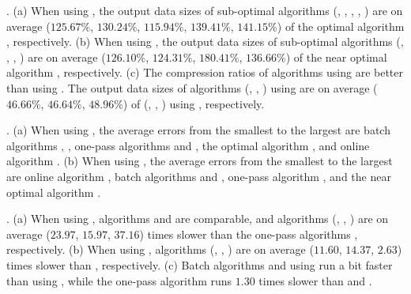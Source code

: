 \emph{}. 
(a) When using \ped, the output data sizes of sub-optimal algorithms (\tpa,
\dpa, \bqsa, \siped, \operb) are on average ($125.67\%$, $130.24\%$, $115.94\%$, $139.41\%$, $141.15\%$)
of the optimal algorithm \optp, respectively.
(b) When using \sed, the output data sizes of sub-optimal algorithms (\tpa,
\dpa, \squishe, \cised) are on average ($126.10\%$, $124.31\%$, $180.41\%$, $136.66\%$) of the near optimal algorithm \nopts, respectively.
(c) The compression ratios of algorithms using \ped are better than
using \sed. The output data sizes of algorithms (\optp, \tpa, \dpa) using \ped
are on average ($46.66\%$, $46.64\%$, $48.96\%$) of (\nopts, \tpa, \dpa) using \sed, respectively.

\emph{}. 
(a) When using \ped, the average errors from the smallest to the largest are batch algorithms \tpa, \dpa, one-pass algorithms \siped and \operb, the optimal algorithm \optp, and online algorithm \bqsa. 
(b) When using \sed, the average errors from the smallest to the largest are online algorithm \squishe, batch algorithms \tpa and \dpa, one-pass algorithm \cised, and the near optimal algorithm \nopts.

\emph{}.
(a) When using \ped, algorithms \siped and \operb are comparable, and algorithms
(\tpa, \dpa, \bqsa) are on average ($23.97$, $15.97$, $37.16$) times slower than the one-pass algorithms \siped, respectively. 
(b) When using \sed, algorithms (\tpa, \dpa, \squishe) are on average ($11.60$, $14.37$, $2.63$) times slower than \cised, respectively.
(c) Batch algorithms \dpa and \tpa using \sed run a bit faster than using \ped, while the one-pass algorithm \cised runs {$1.30$} times slower than \siped and \operb.




